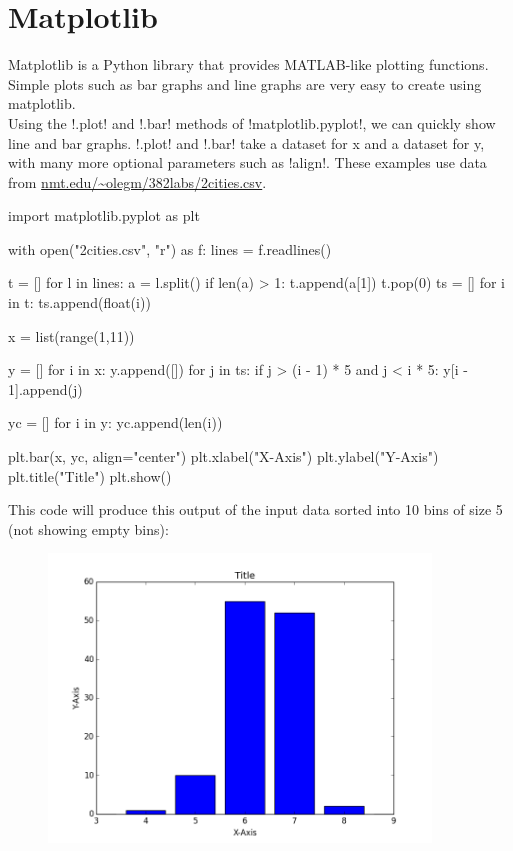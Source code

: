 \documentclass[11pt]{cselabheader}
\begin{document}
\section{Matplotlib}
Matplotlib is a Python library that provides MATLAB-like plotting functions.  Simple plots such as bar graphs and line graphs are very easy to create using matplotlib.\\
Using the \pythoninline!.plot! and \pythoninline!.bar! methods of \pythoninline!matplotlib.pyplot!, we can quickly show line and bar graphs. \pythoninline!.plot! and \pythoninline!.bar! take a dataset for x and a dataset for y, with many more optional parameters such as \pythoninline!align!.  These examples use data from \url{nmt.edu/~olegm/382labs/2cities.csv}.

\begin{python3code}
import matplotlib.pyplot as plt

with open("2cities.csv", "r") as f:
        lines = f.readlines()

t = []
for l in lines:
        a = l.split()
        if len(a) > 1:
                t.append(a[1])
t.pop(0)
ts = []
for i in t:
        ts.append(float(i))

x = list(range(1,11))

y = []
for i in x:
        y.append([])
        for j in ts:
                if j > (i - 1) * 5 and j < i * 5:
                        y[i - 1].append(j)

yc = []
for i in y:
        yc.append(len(i))

plt.bar(x, yc, align="center")
plt.xlabel("X-Axis")
plt.ylabel("Y-Axis")
plt.title("Title")
plt.show()
\end{python3code}

This code will produce this output of the input data sorted into 10 bins of size 5 (not showing empty bins):\\
\begin{figure}[h]
  \centering
  \includegraphics[width=4.0in]{img/bar1}
\end{figure}
\end{document}
